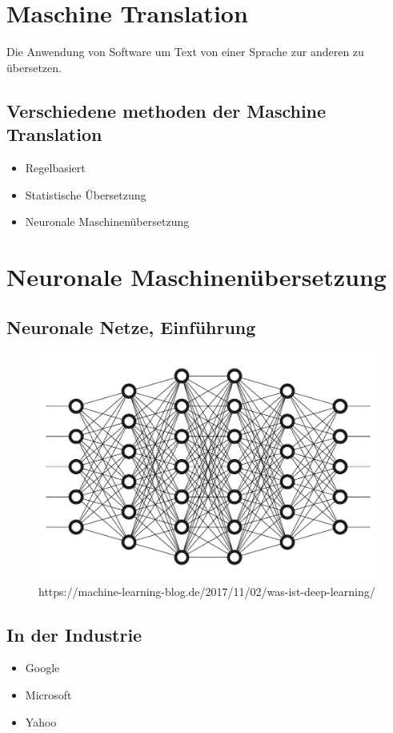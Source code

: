 \documentclass{article}
\begin{document}
\section{Maschine Translation}
Die Anwendung von Software um Text von einer Sprache zur anderen zu übersetzen.
\subsection{Verschiedene methoden der Maschine Translation}
\begin{itemize}
	\item Regelbasiert
	\item Statistische Übersetzung
	\item Neuronale Maschinenübersetzung
\end{itemize}
\newpage
\section{Neuronale Maschinenübersetzung}
\subsection{Neuronale Netze, Einführung}
\begin{figure}[h]
  \includegraphics[width=\linewidth]{images/DeepNeuralNetwork.jpg}
  \caption{https://machine-learning-blog.de/2017/11/02/was-ist-deep-learning/}
  \label{fig:Neuronales Netz}
\end{figure}
\subsection{In der Industrie}
\begin{itemize}
	\item Google
	\item Microsoft
	\item Yahoo
\end{itemize}
\end{document}
